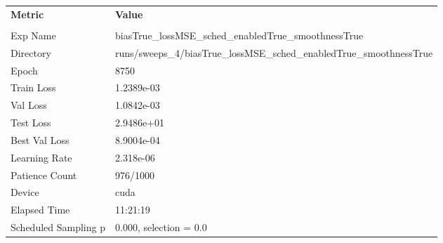 \begin{tabular}{|l|l|}
\hline
\textbf{Metric} & \textbf{Value} \\\\
Exp Name & biasTrue_lossMSE_sched_enabledTrue_smoothnessTrue \\ 
Directory & runs/sweeps_4/biasTrue_lossMSE_sched_enabledTrue_smoothnessTrue \\ 
Epoch & 8750 \\ 
Train Loss & 1.2389e-03 \\ 
Val Loss & 1.0842e-03 \\ 
Test Loss & 2.9486e+01 \\ 
Best Val Loss & 8.9004e-04 \\ 
Learning Rate & 2.318e-06 \\ 
Patience Count & 976/1000 \\ 
Device & cuda \\ 
Elapsed Time & 11:21:19 \\ 
Scheduled Sampling p & 0.000, selection = 0.0 \\ 
\hline
\end{tabular}